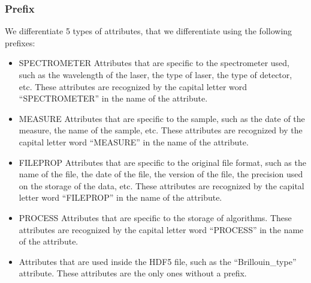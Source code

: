 \documentclass[letterpaper,10pt,english]{sphinxmanual}
\begin{document}
\subsubsection{Prefix}
\label{\detokenize{source/normalization:prefix}}
\sphinxAtStartPar
We differentiate 5 types of attributes, that we differentiate using the following prefixes:
\begin{itemize}
\item {} 
\sphinxAtStartPar
SPECTROMETER \sphinxhyphen{} Attributes that are specific to the spectrometer used, such as the wavelength of the laser, the type of laser, the type of detector, etc. These attributes are recognized by the capital letter word “SPECTROMETER” in the name of the attribute.

\item {} 
\sphinxAtStartPar
MEASURE \sphinxhyphen{} Attributes that are specific to the sample, such as the date of the measure, the name of the sample, etc. These attributes are recognized by the capital letter word “MEASURE” in the name of the attribute.

\item {} 
\sphinxAtStartPar
FILEPROP \sphinxhyphen{} Attributes that are specific to the original file format, such as the name of the file, the date of the file, the version of the file, the precision used on the storage of the data, etc. These attributes are recognized by the capital letter word “FILEPROP” in the name of the attribute.

\item {} 
\sphinxAtStartPar
PROCESS \sphinxhyphen{} Attributes that are specific to the storage of algorithms. These attributes are recognized by the capital letter word “PROCESS” in the name of the attribute.

\item {} 
\sphinxAtStartPar
Attributes that are used inside the HDF5 file, such as the “Brillouin\_type” attribute. These attributes are the only ones without a prefix.

\end{itemize}
\end{document}
